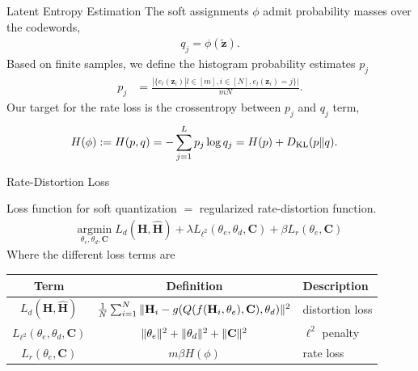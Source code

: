 \documentclass{beamer}
\begin{document}
  \begin{frame}{Latent Entropy Estimation}
    \footnotesize{
    The soft assignments $\phi$ admit probability masses over the codewords,
    \begin{align*} 
      q_j = \phi(\tilde{\mathbf z}).
    \end{align*}
    Based on finite samples, we define the histogram probability estimates $p_j$
    \begin{align*}
    p_j &= \frac{|\{e_l(\mathbf z_i)|l\in[m], i \in [N], e_l(\mathbf z_i)=j\}|}{mN}.
    \end{align*}
    Our target for the rate loss is the crossentropy between $p_j$ and $q_j$ term,
    \begin{align*}
    H(\phi) := H(p,q) &= -\sum_{j=1}^L p_j\log q_j = H(p) + D_{\text{KL}}(p\Arrowvert q).
    \end{align*}
    }
  \end{frame}

  \begin{frame}{Rate-Distortion Loss}
    \footnotesize{
    Loss function for soft quantization $=$ regularized rate-distortion function.
    \begin{align}
      \underset{\theta_e, \theta_d, \mathbf C}{\text{argmin}}\; L_{d}(\mathbf H, \hat {\mathbf H}) + \lambda L_{\ell^2}(\theta_e, \theta_d, \mathbf C) + \beta L_{r}(\theta_e,\mathbf C)
    \end{align} 
    Where the different loss terms are

      \begin{table}[]
      \centering
      \begin{tabular}{c|c|l}
      \toprule
      \textbf{Term} & \textbf{Definition} & \textbf{Description} \\ \midrule
       $ L_{d}(\mathbf H, \hat {\mathbf H}) $ & $ \frac 1N \sum_{i=1}^N\Arrowvert \mathbf H_i - g(Q(f(\mathbf H_i, \theta_e), \mathbf C), \theta_d) \Arrowvert^2 $ & distortion loss \\ \hline
       $ L_{\ell^2}(\theta_e, \theta_d, \mathbf C) $ & $ \Arrowvert\theta_e\Arrowvert^2+\Arrowvert\theta_d\Arrowvert^2+\Arrowvert \mathbf C \Arrowvert^2 $ & $\ell^2$ penalty \\ \hline
       $ L_{r}(\theta_e, \mathbf C) $ & $m\beta H(\phi)$  & rate loss \\ \bottomrule
      \end{tabular}
      \end{table}
    }
  \end{frame}
\end{document}
